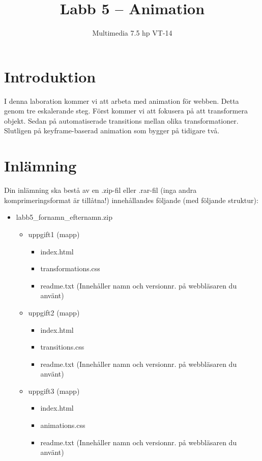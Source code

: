 \documentclass[12pt]{article}
\date{}
\title{ Labb 5 -- Animation }
\author{ Multimedia 7.5 hp VT-14 }
\begin{document}
\maketitle
\vspace{-3.5em}




\section{Introduktion}
I denna laboration kommer vi att arbeta med animation för webben. Detta genom tre eskalerande steg. Först kommer vi att fokusera på att transformera objekt. Sedan på automatiserade transitions mellan olika transformationer. Slutligen på keyframe-baserad animation som bygger på tidigare två.

\section{Inlämning}
Din inlämning ska bestå av en .zip-fil eller .rar-fil (inga andra komprimeringsformat är tillåtna!) innehållandes följande (med följande struktur):
  \begin{itemize}
    \item labb5\_fornamn\_efternamn.zip
      \vspace{-0.5em}
      \begin{itemize}
        \item uppgift1 (mapp)
          \begin{itemize}
            \item index.html
            \item transformations.css
            \item readme.txt (Innehåller namn och versionnr. på webbläsaren du använt)
          \end{itemize}
        \item uppgift2 (mapp)
          \begin{itemize}
            \item index.html
            \item transitions.css
            \item readme.txt (Innehåller namn och versionnr. på webbläsaren du använt)
          \end{itemize}
        \item uppgift3 (mapp)
          \begin{itemize}
            \item index.html
            \item animations.css
            \item readme.txt (Innehåller namn och versionnr. på webbläsaren du använt)
          \end{itemize}
    \end{itemize}
  \end{itemize}
\end{document}
